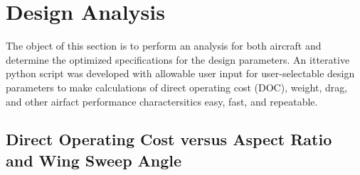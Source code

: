 \documentclass{article}
\begin{document}
    \section{Design Analysis}
    \label{sec:design}
    \begin{flushleft}
        The object of this section is to perform an analysis for both aircraft
        and determine the optimized specifications for the design parameters. An
        itterative python script was developed with allowable user input for
        user-selectable design parameters to make calculations of direct
        operating cost (DOC), weight, drag, and other airfact performance
        charactersitics easy, fast, and repeatable.
    \end{flushleft}

    \subsection{Direct Operating Cost versus Aspect Ratio and Wing Sweep Angle}
    \label{sec:AR}
\end{document}

